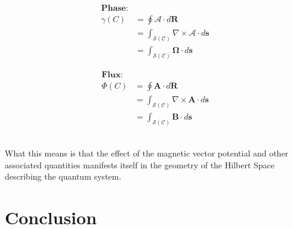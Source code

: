 \documentclass{article}
\begin{document}
    \begin{minipage}{0.4\textwidth}
       \begin{align*}
         \textbf{Phase:}&\\
         \gamma(C) &= \oint \bm{\mathcal{A}} \cdot d\bm{R} \\
                   &= \int_{\mathcal{S}(\mathcal{C})} 
                      \nabla \times \bm{\mathcal{A}} \cdot d\bm{s}\\
                   &= \int_{\mathcal{S}(\mathcal{C})} \bm{\Omega} \cdot d\bm{s}
       \end{align*}
    \end{minipage}
    \hspace{0.05\textwidth}
    \begin{minipage}{0.4\textwidth}
      \begin{align*}
        \textbf{Flux:}&\\
        \Phi(C) &= \oint \bm{A} \cdot d\bm{R} \\
                &= \int_{\mathcal{S}(\mathcal{C})}
                   \nabla \times \bm{A} \cdot d\bm{s} \\
                &= \int_{\mathcal{S}(\mathcal{C})} \bm{B} \cdot d\bm{s}
      \end{align*}
    \end{minipage}\\

What this means is that the effect of the magnetic vector potential and other associated quantities manifests itself in the geometry of the Hilbert Space describing the quantum system.

\section{Conclusion}\label{sec:conclusion}



\end{document}
